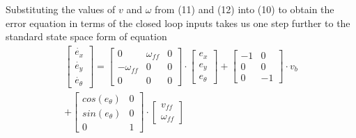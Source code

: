 \documentclass[conference]{IEEEtran}
\begin{document}
Substituting the values of $v$ and $\omega$ from (11) and (12) into (10) to obtain the error equation in terms of the closed loop inputs takes us one step further to the standard state space form of equation
\begin{equation}\label{eq}
\begin{split}
\begin{bmatrix}
\dot{e_{x}}\\ 
\dot{e_{y}}\\ 
\dot{e_{\theta}}
\end{bmatrix}
=
\begin{bmatrix}
0 & \omega_{ff} & 0\\ 
-\omega_{ff} & 0 & 0\\ 
0 & 0 & 0
\end{bmatrix}
\cdot 
\begin{bmatrix}
e_{x}\\ 
e_{y}\\ 
e_{\theta}
\end{bmatrix}
+
\begin{bmatrix}
-1 & 0\\ 
0 & 0\\
0 & -1
\end{bmatrix}
\cdot 
v_{b} \\
+
\begin{bmatrix}
cos(e_{\theta}) & 0\\ 
sin(e_{\theta}) & 0\\
0 & 1
\end{bmatrix}
\cdot 
\begin{bmatrix}
v_{ff}\\
\omega_{ff}
\end{bmatrix}
\end{split}
\end{equation}
\end{document}
